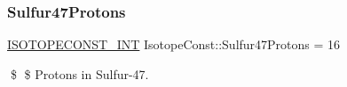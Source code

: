 \subsubsection{\texorpdfstring{Sulfur47\+Protons}{Sulfur47Protons}}
{\footnotesize\ttfamily \mbox{\hyperlink{group___isotope_const-_macros_ga5f18360b3e99483a35c32d789e62621c}{I\+S\+O\+T\+O\+P\+E\+C\+O\+N\+S\+T\+\_\+\+I\+NT}} Isotope\+Const\+::\+Sulfur47\+Protons = 16}

\$ \$ Protons in Sulfur-\/47. 